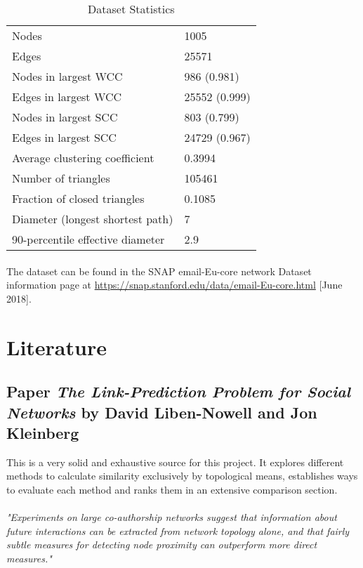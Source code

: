 \documentclass[12pt,a4paper]{report}
\begin{document}
\begin{table}[h]
\centering
\caption{Dataset Statistics} 
\label{datasetProperties}
\begin{tabular}{@{}ll@{}}
Nodes & 1005 \\
Edges & 25571 \\
Nodes in largest WCC & 986 (0.981) \\
Edges in largest WCC & 25552 (0.999) \\
Nodes in largest SCC & 803 (0.799) \\
Edges in largest SCC & 24729 (0.967) \\
Average clustering coefficient & 0.3994 \\
Number of triangles & 105461 \\
Fraction of closed triangles & 0.1085 \\
Diameter (longest shortest path) & 7 \\
90-percentile effective diameter & 2.9
\end{tabular}
\end{table}

\paragraph{} The dataset can be found in the SNAP email-Eu-core network Dataset information page at \url{https://snap.stanford.edu/data/email-Eu-core.html} [June 2018].





\section{Literature}

\subsection{Paper \emph{The Link-Prediction Problem for Social Networks} by David Liben-Nowell and Jon Kleinberg} This is a very solid and exhaustive source for this project. It explores different methods to calculate similarity exclusively by topological means, establishes ways to evaluate each method and ranks them in an extensive comparison section.

\paragraph{} \emph{"Experiments on large co-authorship networks suggest that information about future interactions can be extracted from network topology alone, and that fairly subtle measures for detecting node proximity can outperform more direct measures."}
\end{document}
